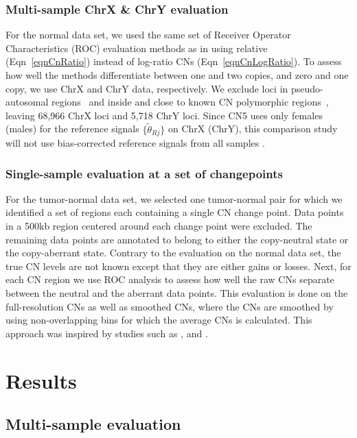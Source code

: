 \documentclass{bioinfo}
\begin{document}
\subsubsection{Multi-sample ChrX \& ChrY evaluation}
For the normal data set, we used the same set of Receiver Operator Characteristics (ROC) evaluation methods as in \citet{BengtssonH_etal_2008} using relative (Eqn~\eqref{eqnCnRatio}) instead of log-ratio CNs (Eqn~\eqref{eqnCnLogRatio}).
To assess how well the methods differentiate between one and two copies, and zero and one copy, we use ChrX and ChrY data, respectively.  We exclude loci in pseudo-autosomal regions~\citep{BlaschkeRappold_2006} and inside and close to known CN polymorphic regions~\citep{RedonR_etal_2006}, leaving 68,966 ChrX loci and 5,718 ChrY loci.
Since CN5 uses only females (males) for the reference signals $\{\tilde\theta_{Rj}\}$ on ChrX (ChrY), this comparison study will not use bias-corrected reference signals from all samples \citep{BengtssonH_etal_2008}.

\subsubsection{Single-sample evaluation at a set of changepoints}
For the tumor-normal data set, we selected one tumor-normal pair for which we identified a set of regions each containing a single CN change point.
Data points in a 500kb region centered around each change point were excluded.  The remaining data points are annotated to belong to either the copy-neutral state or the copy-aberrant state.  Contrary to the evaluation on the normal data set, the true CN levels are not known except that they are either gains or losses.
Next, for each CN region we use ROC analysis to assess how well the raw CNs separate between the neutral and the aberrant data points.  This evaluation is done on the full-resolution CNs as well as smoothed CNs, where the CNs are smoothed by using non-overlapping bins for which the average CNs is calculated.
This approach was inspired by studies such as \citet{LaiW_etal_2005}, and \citet{WillenbrockFridlyand_2005}.



 
\section{Results}
\label{secResults}

\subsection{Multi-sample evaluation}
\end{document}
